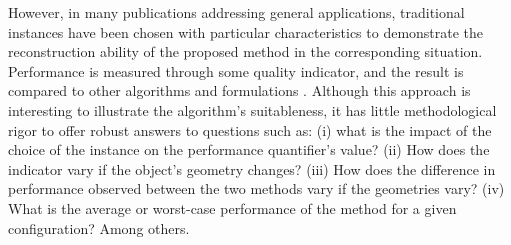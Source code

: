 		However, in many publications addressing general applications, traditional instances have been chosen with particular characteristics to demonstrate the reconstruction ability of the proposed method in the corresponding situation. Performance is measured through some quality indicator, and the result is compared to other algorithms and formulations \citep{zhong2020multiresolution,zhang2020wavelet,zhou2021improved}. Although this approach is interesting to illustrate the algorithm's suitableness, it has little methodological rigor to offer robust answers to questions such as: (i) what is the impact of the choice of the instance on the performance quantifier's value? (ii) How does the indicator vary if the object's geometry changes? (iii) How does the difference in performance observed between the two methods vary if the geometries vary? (iv) What is the average or worst-case performance of the method for a given configuration? Among others.
		
